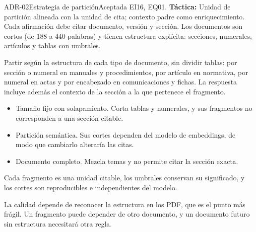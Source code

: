 \begin{adr}{ADR-02}{Estrategia de partición}{Aceptada}
 EI16, EQ01. \textbf{Táctica:} Unidad de partición alineada con la unidad de cita; contexto padre como enriquecimiento.
Cada afirmación debe citar documento, versión y sección. Los documentos son cortos (de 188 a 440 palabras) y tienen estructura explícita:
secciones, numerales, artículos y tablas con umbrales.

Partir según la estructura de cada tipo de documento, sin dividir tablas: por sección o numeral en manuales y procedimientos, por artículo en
normativa, por numeral en actas y por encabezado en comunicaciones y fichas. La respuesta incluye además el contexto de la sección a la que pertenece el fragmento.

\begin{itemize}
  \item Tamaño fijo con solapamiento. Corta tablas y numerales, y sus fragmentos no corresponden a una sección citable.
  \item Partición semántica. Sus cortes dependen del modelo de embeddings, de modo que cambiarlo alteraría las citas.
  \item Documento completo. Mezcla temas y no permite citar la sección exacta.
\end{itemize}

Cada fragmento es una unidad citable, los umbrales conservan su significado, y los cortes son reproducibles e independientes del modelo.

La calidad depende de reconocer la estructura en los PDF, que es el punto más frágil. Un fragmento puede depender de otro documento, y un documento futuro sin estructura necesitará otra regla.\end{adr}

